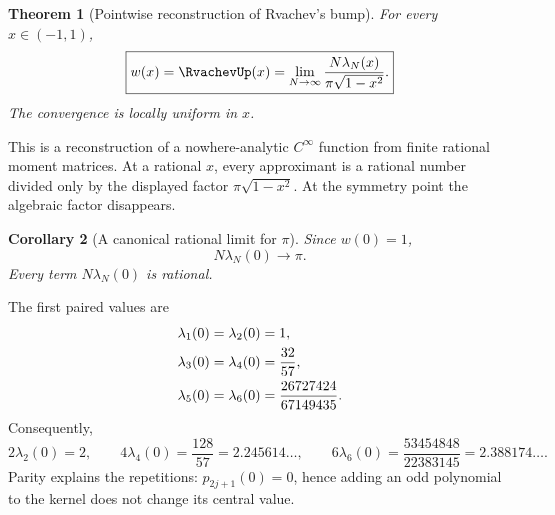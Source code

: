 \documentclass[11pt,oneside]{article}
\newtheorem{theorem}{Theorem}[section]
\newtheorem{corollary}[theorem]{Corollary}
\theoremstyle{definition}
\theoremstyle{remark}
\numberwithin{equation}{section}
\begin{document}
\begin{theorem}[Pointwise reconstruction of Rvachev's bump]
\label{thm:christoffel-reconstruction}
For every $x\in(-1,1)$,
\begin{equation}
 \boxed{
 w(x)=\RvachevUp(x)=\lim_{N\to\infty}
 \frac{N\lambda_N(x)}{\pi\sqrt{1-x^2}}.}
 \label{eq:up-christoffel-reconstruction}
\end{equation}
The convergence is locally uniform in $x$.
\end{theorem}

This is a reconstruction of a nowhere-analytic $C^\infty$ function from
finite rational moment matrices.  At a rational $x$, every approximant is a
rational number divided only by the displayed factor
$\pi\sqrt{1-x^2}$.  At the symmetry point the algebraic factor disappears.

\begin{corollary}[A canonical rational limit for $\pi$]
\label{cor:christoffel-pi}
Since $w(0)=1$,
\begin{equation}
 \boxed{N\lambda_N(0)\longrightarrow\pi.}
 \label{eq:christoffel-pi}
\end{equation}
Every term $N\lambda_N(0)$ is rational.
\end{corollary}

The first paired values are
\begin{align}
 \lambda_1(0)=\lambda_2(0)&=1,\notag\\
 \lambda_3(0)=\lambda_4(0)&=\frac{32}{57},\notag\\
 \lambda_5(0)=\lambda_6(0)&=
   \frac{26727424}{67149435}.
 \label{eq:first-christoffel-values}
\end{align}
Consequently,
\begin{equation}
 2\lambda_2(0)=2,
 \qquad
 4\lambda_4(0)=\frac{128}{57}=2.245614\ldots,
 \qquad
 6\lambda_6(0)=
 \frac{53454848}{22383145}=2.388174\ldots.
 \label{eq:first-christoffel-pi-values}
\end{equation}
Parity explains the repetitions: $p_{2j+1}(0)=0$, hence adding an odd
polynomial to the kernel does not change its central value.
\end{document}
